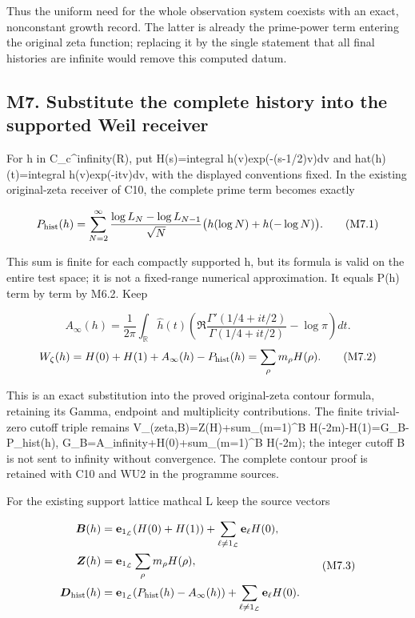 \documentclass[
]{article}
\begin{document}
Thus the uniform need for the whole observation system coexists with an
exact, nonconstant growth record. The latter is already the prime-power
term entering the original zeta function; replacing it by the single
statement that all final histories are infinite would remove this
computed datum.

\subsection{M7. Substitute the complete history into the supported Weil
receiver}\label{m7.-substitute-the-complete-history-into-the-supported-weil-receiver}

For h in C\_c\^{}infinity(R), put H(s)=integral h(v)exp(-(s-1/2)v)dv and
hat(h)(t)=integral h(v)exp(-itv)dv, with the displayed conventions
fixed. In the existing original-zeta receiver of C10, the complete prime
term becomes exactly

\[
P_{\rm hist}(h)=\sum_{N=2}^{\infty}
\frac{\log L_N-\log L_{N-1}}{\sqrt N}
\bigl(h(\log N)+h(-\log N)\bigr).
\tag{M7.1}
\]

This sum is finite for each compactly supported h, but its formula is
valid on the entire test space; it is not a fixed-range numerical
approximation. It equals P(h) term by term by M6.2. Keep

\[
A_\infty(h)=\frac1{2\pi}\int_{\mathbb R}\widehat h(t)
\left(\Re\frac{\Gamma'(1/4+it/2)}{\Gamma(1/4+it/2)}-\log\pi\right)dt.
\] \[
W_\zeta(h)=H(0)+H(1)+A_\infty(h)-P_{\rm hist}(h)
=\sum_\rho m_\rho H(\rho).
\tag{M7.2}
\]

This is an exact substitution into the proved original-zeta contour
formula, retaining its Gamma, endpoint and multiplicity contributions.
The finite trivial-zero cutoff triple remains
V\_(zeta,B)=Z(H)+sum\_(m=1)\^{}B H(-2m)-H(1)=G\_B-P\_hist(h),
G\_B=A\_infinity+H(0)+sum\_(m=1)\^{}B H(-2m); the integer cutoff B is
not sent to infinity without convergence. The complete contour proof is
retained with C10 and WU2 in the programme sources.

For the existing support lattice mathcal L keep the source vectors

\[
\begin{aligned}
\boldsymbol B(h)&=\mathbf e_{1_{\mathcal L}}(H(0)+H(1))
+\sum_{\ell\ne1_{\mathcal L}}\mathbf e_\ell H(0),\\
\boldsymbol Z(h)&=\mathbf e_{1_{\mathcal L}}\sum_\rho m_\rho H(\rho),\\
\boldsymbol D_{\rm hist}(h)&=\mathbf e_{1_{\mathcal L}}(P_{\rm hist}(h)-A_\infty(h))
+\sum_{\ell\ne1_{\mathcal L}}\mathbf e_\ell H(0).
\end{aligned}
\tag{M7.3}
\]
\end{document}
